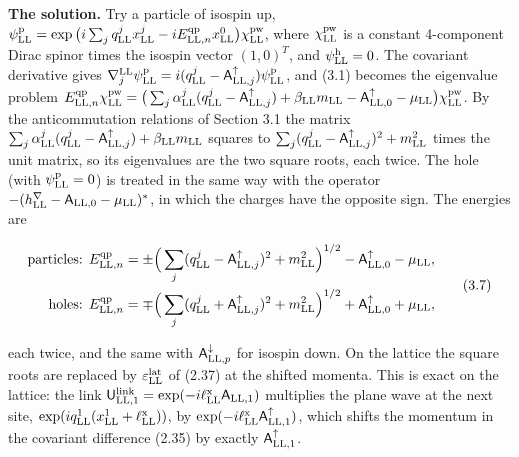 \documentclass[
  10pt,
]{article}
\begin{document}
\textbf{The solution.} Try a particle of isospin up,
\(\psi^{\rm p}_{\rm LL}=\exp\big(i\sum_jq^j_{\rm LL}x^j_{\rm LL}-iE^{\rm qp}_{{\rm LL},n}x^0_{\rm LL}\big)\chi^{\rm pw}_{\rm LL}\),
where \(\chi^{\rm pw}_{\rm LL}\) is a constant 4-component Dirac spinor
times the isospin vector \((1,0)^T\), and \(\psi^{\rm h}_{\rm LL}=0\).
The covariant derivative gives
\(\nabla^{\rm LL}_j\psi^{\rm p}_{\rm LL}=i(q^j_{\rm LL}-\mathsf A^\uparrow_{{\rm LL},j})\psi^{\rm p}_{\rm LL}\),
and (3.1) becomes the eigenvalue problem
\(E^{\rm qp}_{{\rm LL},n}\chi^{\rm pw}_{\rm LL}=\big(\sum_j\alpha^j_{\rm LL}(q^j_{\rm LL}-\mathsf A^\uparrow_{{\rm LL},j})+\beta_{\rm LL}m_{\rm LL}-\mathsf A^\uparrow_{{\rm LL},0}-\mu_{\rm LL}\big)\chi^{\rm pw}_{\rm LL}\).
By the anticommutation relations of Section 3.1 the matrix
\(\sum_j\alpha^j_{\rm LL}(q^j_{\rm LL}-\mathsf A^\uparrow_{{\rm LL},j})+\beta_{\rm LL}m_{\rm LL}\)
squares to
\(\sum_j(q^j_{\rm LL}-\mathsf A^\uparrow_{{\rm LL},j})^2+m_{\rm LL}^2\)
times the unit matrix, so its eigenvalues are the two square roots, each
twice. The hole (with \(\psi^{\rm p}_{\rm LL}=0\)) is treated in the
same way with the operator
\(-(h^\nabla_{\rm LL}-\mathsf A_{{\rm LL},0}-\mu_{\rm LL})^*\), in which
the charges have the opposite sign. The energies are

\[\begin{aligned}\text{particles: }E^{\rm qp}_{{\rm LL},n}&=\pm\Big(\sum_j(q^j_{\rm LL}-\mathsf A^\uparrow_{{\rm LL},j})^2+m_{\rm LL}^2\Big)^{1/2}-\mathsf A^\uparrow_{{\rm LL},0}-\mu_{\rm LL},\\\text{holes: }E^{\rm qp}_{{\rm LL},n}&=\mp\Big(\sum_j(q^j_{\rm LL}+\mathsf A^\uparrow_{{\rm LL},j})^2+m_{\rm LL}^2\Big)^{1/2}+\mathsf A^\uparrow_{{\rm LL},0}+\mu_{\rm LL},\end{aligned}\tag{3.7}\]

each twice, and the same with \(\mathsf A^\downarrow_{{\rm LL},p}\) for
isospin down. On the lattice the square roots are replaced by
\(\varepsilon^{\rm lat}_{\rm LL}\) of (2.37) at the shifted momenta.
This is exact on the lattice: the link
\(\mathsf U^{\rm link}_{{\rm LL},1}=\exp(-i\ell^{\rm x}_{\rm LL}\mathsf A_{{\rm LL},1})\)
multiplies the plane wave at the next site,
\(\exp(iq^1_{\rm LL}(x^1_{\rm LL}+\ell^{\rm x}_{\rm LL}))\), by
\(\exp(-i\ell^{\rm x}_{\rm LL}\mathsf A^\uparrow_{{\rm LL},1})\), which
shifts the momentum in the covariant difference (2.35) by exactly
\(\mathsf A^\uparrow_{{\rm LL},1}\).
\end{document}
